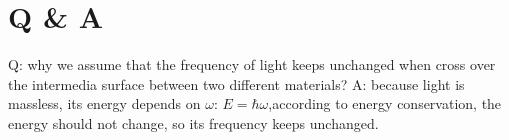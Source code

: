 \chapter{Q \& A}
Q: why we assume that the frequency of light keeps unchanged when cross over the intermedia surface between two different materials?
A: because light is massless, its energy depends on $\omega$: $E = \hbar\omega$,according to energy conservation, the energy should not change, so its frequency keeps unchanged.
